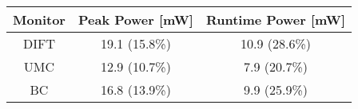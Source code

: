 

\begin{tabular}{|c|c|c|}
\hline

{\bf Monitor} & {\bf Peak Power [mW]} & {\bf Runtime Power [mW]} \\ \hline\hline

DIFT & 19.1 (15.8\%) & 10.9 (28.6\%) \\ \hline
UMC  & 12.9 (10.7\%) &  7.9 (20.7\%) \\ \hline
BC   & 16.8 (13.9\%) &  9.9 (25.9\%) \\ \hline

\end{tabular}

